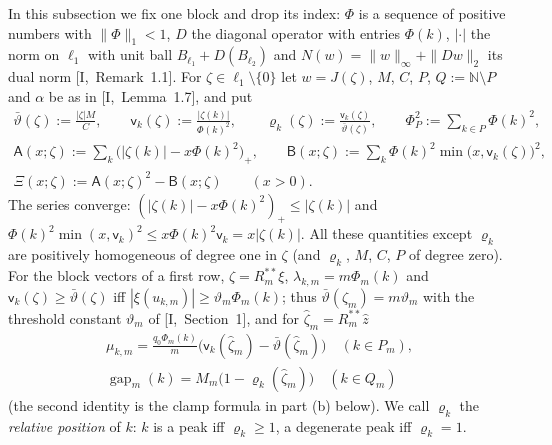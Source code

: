 \documentclass[10pt]{amsart}
\theoremstyle{definition}
\theoremstyle{remark}
\newcommand{\N}{\mathbb N}
\newcommand{\gap}{\operatorname{gap}}
\newcommand{\zh}{\hat z}
\begin{document}
In this subsection we fix one block and drop its index: $\Phi$ is a
sequence of positive numbers with $\|\Phi\|_1<1$, $D$ the diagonal
operator with entries $\Phi(k)$, $|\cdot|$ the norm on $\ell_1$ with unit
ball $B_{\ell_1}+D(B_{\ell_2})$ and $N(w)=\|w\|_\infty+\|Dw\|_2$ its dual
norm [I,~Remark~1.1].  For $\zeta\in\ell_1\setminus\{0\}$ let $w=J(\zeta)$,
$M$, $C$, $P$, $Q:=\N\setminus P$ and $\alpha$ be as in [I,~Lemma~1.7], and put
\begin{gather*}
 \bar\vartheta(\zeta):=\frac{|\zeta|M}{C},\qquad
 \mathsf v_k(\zeta):=\frac{|\zeta(k)|}{\Phi(k)^2},\qquad
 \varrho_k(\zeta):=\frac{\mathsf v_k(\zeta)}{\bar\vartheta(\zeta)},\qquad
 \Phi_P^2:=\sum_{k\in P}\Phi(k)^2,\\
 \mathsf A(x;\zeta):=\sum_k\big(|\zeta(k)|-x\Phi(k)^2\big)_+,\qquad
 \mathsf B(x;\zeta):=\sum_k\Phi(k)^2\min\big(x,\mathsf v_k(\zeta)\big)^2,\\
 \Xi(x;\zeta):=\mathsf A(x;\zeta)^2-\mathsf B(x;\zeta)\qquad(x>0).
\end{gather*}
The series converge: $(|\zeta(k)|-x\Phi(k)^2)_+\le|\zeta(k)|$ and
$\Phi(k)^2\min(x,\mathsf v_k)^2\le x\Phi(k)^2\mathsf v_k=x|\zeta(k)|$.  All
these quantities except $\varrho_k$ are positively homogeneous of degree
one in $\zeta$ (and $\varrho_k$, $M$, $C$, $P$ of degree zero).  For the
block vectors of a first row, $\zeta=R_m^{**}\xi$, $\lambda_{k,m}=m\Phi_m(k)$
and $\mathsf v_k(\zeta)\ge\bar\vartheta(\zeta)$ iff $|\xi(u_{k,m})|\ge
\vartheta_m\Phi_m(k)$; thus $\bar\vartheta(\zeta_m)=m\vartheta_m$ with the
threshold constant $\vartheta_m$ of [I,~Section~1], and for
$\hat\zeta_m=R_m^{**}\zh$
\[
 \begin{gathered}
 \mu_{k,m}=\frac{q_0\Phi_m(k)}{m}\big(\mathsf v_k(\hat\zeta_m)-\bar\vartheta
 (\hat\zeta_m)\big)\quad(k\in P_m),\\
 \gap_m(k)=M_m\big(1-\varrho_k(\hat\zeta_m)\big)\quad(k\in Q_m)
 \end{gathered}
\]
(the second identity is the clamp formula in part (b) below).  We call
$\varrho_k$ the \emph{relative position} of $k$: $k$ is a peak iff
$\varrho_k\ge1$, a degenerate peak iff $\varrho_k=1$.
\end{document}
